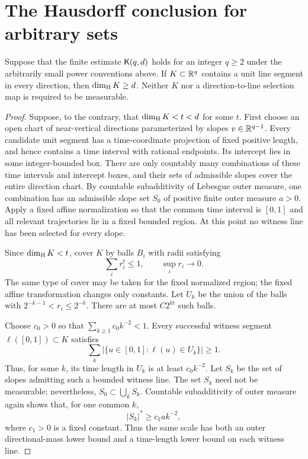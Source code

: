\section{The Hausdorff conclusion for arbitrary sets}\label{sec:hausdorff}

\begin{lemma}\label{lem:hausdorff}
Suppose that the finite estimate $\mathsf K(q,d)$ holds for an integer $q\ge2$ under the arbitrarily small power conventions above.
If $K\subset\mathbb R^q$ contains a unit line segment in every direction, then $\operatorname{dim}_{\mathrm H} K\ge d$.
Neither $K$ nor a direction-to-line selection map is required to be measurable.
\end{lemma}

\begin{proof}
Suppose, to the contrary, that $\operatorname{dim}_{\mathrm H} K<t<d$ for some $t$.
First choose an open chart of near-vertical directions parameterized by slopes $v\in\mathbb R^{q-1}$.
Every candidate unit segment has a time-coordinate projection of fixed positive length,
and hence contains a time interval with rational endpoints. Its intercept lies in some integer-bounded box.
There are only countably many combinations of these time intervals and intercept boxes,
and their sets of admissible slopes cover the entire direction chart.
By countable subadditivity of Lebesgue outer measure, one combination has an admissible slope set $S_0$
of positive finite outer measure $a>0$.
Apply a fixed affine normalization so that the common time interval is $[0,1]$
and all relevant trajectories lie in a fixed bounded region.
At this point no witness line has been selected for every slope.

Since $\operatorname{dim}_{\mathrm H} K<t$, cover $K$ by balls $B_i$ with radii satisfying
\begin{equation}\label{eq:hausdorff-cover}
 \sum_i r_i^t\le1,\qquad\sup_i r_i\longrightarrow0.
\end{equation}
The same type of cover may be taken for the fixed normalized region; the fixed affine transformation changes only constants.
Let $U_k$ be the union of the balls with $2^{-k-1}<r_i\le2^{-k}$.
There are at most $C2^{kt}$ such balls.

Choose $c_0>0$ so that $\sum_{k\ge1}c_0k^{-2}<1$.
Every successful witness segment $\ell([0,1])\subset K$ satisfies
\[
 \sum_k\big|\{u\in[0,1]:\ell(u)\in U_k\}\big|\ge1.
\]
Thus, for some $k$, its time length in $U_k$ is at least $c_0k^{-2}$.
Let $S_k$ be the set of slopes admitting such a bounded witness line.
The set $S_k$ need not be measurable; nevertheless, $S_0\subset\bigcup_kS_k$.
Countable subadditivity of outer measure again shows that, for one common $k$,
\begin{equation}\label{eq:outer-direction}
 |S_k|^*\ge c_1 a k^{-2},
\end{equation}
where $c_1>0$ is a fixed constant.
Thus the same scale has both an outer directional-mass lower bound and a time-length lower bound on each witness line.


\end{proof}
